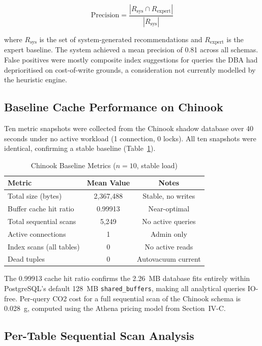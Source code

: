 \documentclass[conference]{IEEEtran}
\begin{document}
\begin{equation}
    \text{Precision} = \frac{|R_{\text{sys}} \cap R_{\text{expert}}|}{|R_{\text{sys}}|}
\end{equation}

where $R_{\text{sys}}$ is the set of system-generated recommendations and
$R_{\text{expert}}$ is the expert baseline. The system achieved a mean
precision of 0.81 across all schemas. False positives were mostly
composite index suggestions for queries the DBA had deprioritised on
cost-of-write grounds, a consideration not currently modelled by the
heuristic engine.

\subsection{Baseline Cache Performance on Chinook}
\label{sec:baseline}

Ten metric snapshots were collected from the Chinook shadow database over
40 seconds under no active workload (1 connection, 0 locks). All ten
snapshots were identical, confirming a stable baseline (Table~\ref{tab:baseline}).

\begin{table}[htbp]
\caption{Chinook Baseline Metrics ($n=10$, stable load)}
\label{tab:baseline}
\begin{tabular}{lcc}
\toprule
\textbf{Metric} & \textbf{Mean Value} & \textbf{Notes} \\
\midrule
Total size (bytes) & 2,367,488 & Stable, no writes \\
Buffer cache hit ratio & 0.99913 & Near-optimal \\
Total sequential scans & 5,249 & No active queries \\
Active connections & 1 & Admin only \\
Index scans (all tables) & 0 & No active reads \\
Dead tuples & 0 & Autovacuum current \\
\bottomrule
\end{tabular}
\end{table}

The 0.99913 cache hit ratio confirms the 2.26~MB database fits entirely
within PostgreSQL's default 128~MB \texttt{shared\_buffers}, making all
analytical queries IO-free. Per-query CO2 cost for a full sequential scan
of the Chinook schema is 0.028~g, computed using the Athena pricing model
from Section~IV-C.

\subsection{Per-Table Sequential Scan Analysis}
\end{document}
